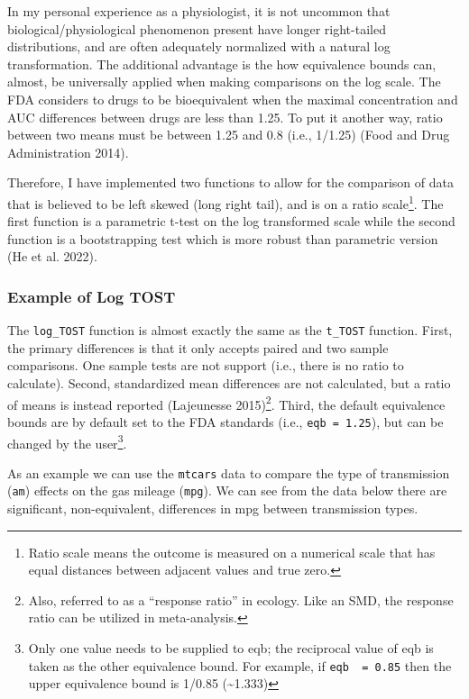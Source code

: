 \documentclass[
]{interact}
\begin{document}
In my personal experience as a physiologist, it is not uncommon that
biological/physiological phenomenon present have longer right-tailed
distributions, and are often adequately normalized with a natural log
transformation. The additional advantage is the how equivalence bounds
can, almost, be universally applied when making comparisons on the log
scale. The FDA considers to drugs to be bioequivalent when the maximal
concentration and AUC differences between drugs are less than 1.25. To
put it another way, ratio between two means must be between 1.25 and 0.8
(i.e., 1/1.25) (Food and Drug Administration 2014).

Therefore, I have implemented two functions to allow for the comparison
of data that is believed to be left skewed (long right tail), and is on
a ratio scale\footnote{Ratio scale means the outcome is measured on a
  numerical scale that has equal distances between adjacent values and
  true zero.}. The first function is a parametric t-test on the log
transformed scale while the second function is a bootstrapping test
which is more robust than parametric version (He et al. 2022).

\hypertarget{example-of-log-tost}{%
\subsubsection{Example of Log TOST}\label{example-of-log-tost}}

The \texttt{log\_TOST} function is almost exactly the same as the
\texttt{t\_TOST} function. First, the primary differences is that it
only accepts paired and two sample comparisons. One sample tests are not
support (i.e., there is no ratio to calculate). Second, standardized
mean differences are not calculated, but a ratio of means is instead
reported (Lajeunesse 2015)\footnote{Also, referred to as a ``response
  ratio'' in ecology. Like an SMD, the response ratio can be utilized in
  meta-analysis.}. Third, the default equivalence bounds are by default
set to the FDA standards (i.e., \texttt{eqb\ =\ 1.25}), but can be
changed by the user\footnote{Only one value needs to be supplied to eqb;
  the reciprocal value of eqb is taken as the other equivalence bound.
  For example, if \texttt{eqb\ \ =\ 0.85} then the upper equivalence
  bound is 1/0.85 (\textasciitilde1.333)}.

As an example we can use the \texttt{mtcars} data to compare the type of
transmission (\texttt{am}) effects on the gas mileage (\texttt{mpg}). We
can see from the data below there are significant, non-equivalent,
differences in mpg between transmission types.
\end{document}
